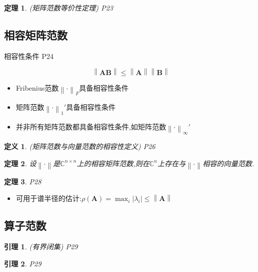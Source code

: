 \documentclass[twoside]{article}
\newtheorem{theorem}{定理}[section]
\newtheorem{lemma}{引理}[section]
\newtheorem{definition}{定义}[section]
\newcommand{\norm}[1]{\left\lVert#1\right\rVert}
\begin{document}
    \begin{theorem}
      (矩阵范数等价性定理) P23
    \end{theorem}

  \subsection{相容矩阵范数}\label{sub:xiang_rong_ju_zhen_fan_shu_}
    相容性条件 P24

    \begin{equation*}
      \norm{\mathbf{AB}} \le \norm{\mathbf{A}} \norm{\mathbf{B}}
    \end{equation*}
    \begin{itemize}
      \item Fribenius范数$\norm{\cdot}_F$具备相容性条件
      \item 矩阵范数$\norm{\cdot}_1'$具备相容性条件
      \item 并非所有矩阵范数都具备相容性条件,如矩阵范数$\norm{\cdot}_\infty'$
    \end{itemize}

    \begin{definition}
      (矩阵范数与向量范数的相容性定义) P26
    \end{definition}

    \begin{theorem}
      设$\norm{\cdot}$是$\mathds{C}^{n\times n}$上的相容矩阵范数,则在$\mathds{C}^{n}$上存在与$\norm{\cdot}$相容的向量范数.
    \end{theorem}

    \begin{theorem}
      P28
    \end{theorem}
    \begin{itemize}
      \item 可用于谱半径的估计:$\rho (\mathbf{A}) = \max _i |\lambda_i| \le \norm{\mathbf{A}}$
    \end{itemize}

  \subsection{算子范数}\label{sub:suan_zi_fan_shu_}
    \begin{lemma}
      (有界闭集) P29
    \end{lemma}

    \begin{lemma}
      P29
    \end{lemma}
\end{document}
